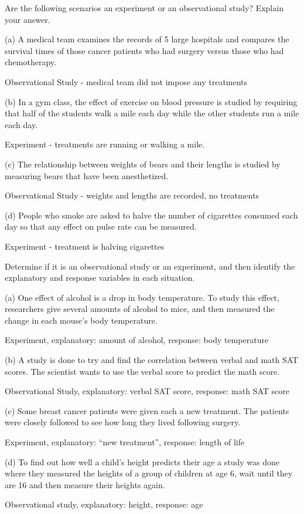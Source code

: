 \documentclass[../stats.tex]{subfiles}
\begin{document}
\begin{example}
    Are the following scenarios an experiment or an observational study? Explain your answer.

    (a) A medical team examines the records of 5 large hospitals and compares the survival times of those cancer patients who had surgery versus those who had chemotherapy.

    Observational Study - medical team did not impose any treatments 

    (b) In a gym class, the effect of exercise on blood pressure is studied by requiring that half of the students walk a mile each day while the other students run a mile each day.

    Experiment - treatments are running or walking a mile.

    (c) The relationship between weights of bears and their lengths is studied by measuring bears that have been anesthetized.

    Observational Study - weights and lengths are recorded, no treatments 

    (d) People who smoke are asked to halve the number of cigarettes consumed each day so that any effect on pulse rate can be measured.

    Experiment - treatment is halving cigarettes
\end{example}

\begin{example}
    Determine if it is an observational study or an experiment, and then identify the explanatory and response variables in each situation.

    (a) One effect of alcohol is a drop in body temperature. To study this effect, researchers give several amounts of alcohol to mice, and then measured the change in each mouse's body temperature.

    Experiment, explanatory: amount of alcohol, response: body temperature 

    (b) A study is done to try and find the correlation between verbal and math SAT scores. The scientist wants to use the verbal score to predict the math score.

    Observational Study, explanatory: verbal SAT score, response: math SAT score 

    (c) Some breast cancer patients were given each a new treatment. The patients were closely followed to see how long they lived following surgery.

    Experiment, explanatory: ``new treatment'', response: length of life 

    (d) To find out how well a child's height predicts their age a study was done where they measured the heights of a group of children at age 6, wait until they are 16 and then measure their heights again.

    Observational study, explanatory: height, response: age
\end{example}
\end{document}
